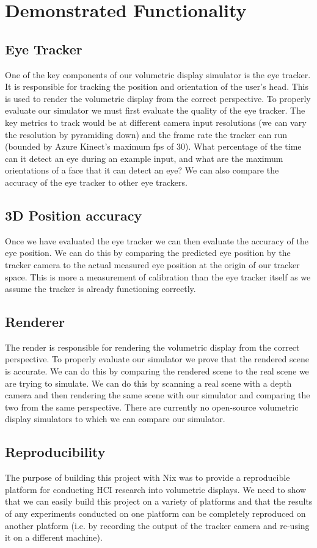 \section{Demonstrated Functionality}
\subsection{Eye Tracker}
One of the key components of our volumetric display simulator is the eye tracker. It is responsible for tracking the position and orientation of the user's head. This is used to render the volumetric display from the correct perspective. To properly evaluate our simulator we must first evaluate the quality of the eye tracker. The key metrics to track would be at different camera input resolutions (we can vary the resolution by pyramiding down) and the frame rate the tracker can run (bounded by Azure Kinect's maximum fps of 30). What percentage of the time can it detect an eye during an example input, and what are the maximum orientations of a face that it can detect an eye? We can also compare the accuracy of the eye tracker to other eye trackers.

\subsection{3D Position accuracy}
Once we have evaluated the eye tracker we can then evaluate the accuracy of the eye position. We can do this by comparing the predicted eye position by the tracker camera to the actual measured eye position at the origin of our tracker space. This is more a measurement of calibration than the eye tracker itself as we assume the tracker is already functioning correctly.

\subsection{Renderer}
The render is responsible for rendering the volumetric display from the correct perspective. To properly evaluate our simulator we prove that the rendered scene is accurate. We can do this by comparing the rendered scene to the real scene we are trying to simulate. We can do this by scanning a real scene with a depth camera and then rendering the same scene with our simulator and comparing the two from the same perspective. There are currently no open-source volumetric display simulators to which we can compare our simulator.

\subsection{Reproducibility}
The purpose of building this project with Nix was to provide a reproducible platform for conducting HCI research into volumetric displays. We need to show that we can easily build this project on a variety of platforms and that the results of any experiments conducted on one platform can be completely reproduced on another platform (i.e. by recording the output of the tracker camera and re-using it on a different machine). 

